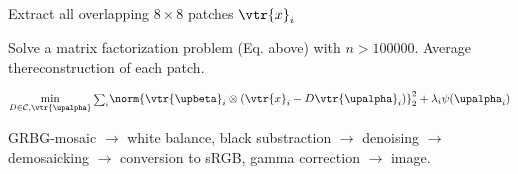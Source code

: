 \begin{compactdesc}
\begin{align*}
	\end{align*}
\item[\lp{solve denoising problem}] \hfill\\
	\begin{enumerate*}[label=\protect\circled{\arabic*},itemjoin=]
		\item Extract all overlapping $8\times 8$ patches $\vtr{x}_i$\\
		\item Solve a matrix factorization problem (Eq. above) with $n>100000$. Average thereconstruction of each patch.
	\end{enumerate*}
\item[\lp{Inpainting, Demosaicking}] 
	\begin{gather*}
		\min_{D\in \mathcal{C},\vtr{\upalpha}}{\scriptstyle\sum_{i}^{}}\norm{\vtr{\upbeta}_i\otimes\left( \vtr{x}_i-D\vtr{\upalpha}_i \right)}_{2}^{2}+\lambda_i\psi(\upalpha_i)
	\end{gather*}
\item[\lp{RAW Image Processing}] GRBG-mosaic $\to$ white balance, black substraction $\to$ denoising $\to$ demosaicking $\to$ conversion to sRGB, gamma correction $\to$ image.
\end{compactdesc}
